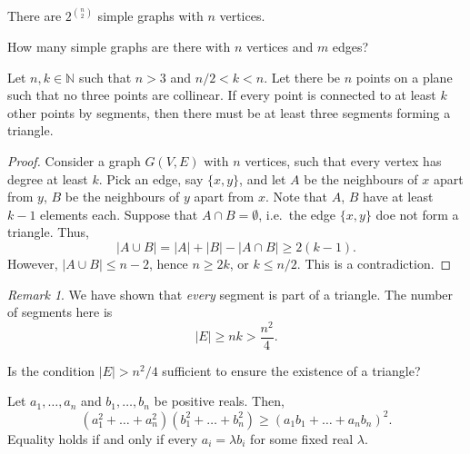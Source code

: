 \documentclass[11pt]{article}
\newcommand{\N}{\mathbb{N}}
\theoremstyle{definition}
\theoremstyle{remark}
\newtheorem*{remark}{Remark}
\numberwithin{equation}{section}
\begin{document}
    \begin{theorem}
        There are $2^{\binom{n}{2}}$ simple graphs with $n$ vertices.
    \end{theorem}
    \begin{exercise}
        How many simple graphs are there with $n$ vertices and $m$ edges?
    \end{exercise}
    \begin{theorem}
        Let $n, k \in \N$ such that $n > 3$ and $n / 2 < k < n$. Let there be $n$
        points on a plane such that no three points are collinear. If every point is
        connected to at least $k$ other points by segments, then there must be at
        least three segments forming a triangle.
    \end{theorem}
    \begin{proof}
        Consider a graph $G(V, E)$ with $n$ vertices, such that every vertex has
        degree at least $k$. Pick an edge, say $\{x, y\}$, and let $A$ be the
        neighbours of $x$ apart from $y$, $B$ be the neighbours of $y$ apart from
        $x$. Note that $A$, $B$ have at least $k - 1$ elements each. Suppose that $A
        \cap B = \emptyset$, i.e.\ the edge $\{x, y\}$ doe not form a triangle. Thus,
        \[
            |A\cup B| = |A| + |B| - |A \cap B| \geq 2(k - 1).
        \] However, $|A\cup B| \leq n - 2$, hence $n \geq 2k$, or $k \leq n / 2$.
        This is a contradiction.
    \end{proof}
    \begin{remark}
        We have shown that \emph{every} segment is part of a triangle. The number of
        segments here is \[
            |E| \geq n k > \frac{n^2}{4}.
        \] 
    \end{remark}
    \begin{exercise}
        Is the condition $|E| > n^2 / 4$ sufficient to ensure the existence of a triangle?
    \end{exercise}

    \begin{lemma}
        Let $a_1, \dots, a_n$ and $b_1, \dots, b_n$ be positive reals. Then, \[
            (a_1^2 + \dots + a_n^2) (b_1^2 + \dots + b_n^2) \geq (a_1b_1 + \dots +
            a_nb_n)^2.
        \] Equality holds if and only if every $a_i = \lambda b_i$ for some fixed
        real $\lambda$.
    \end{lemma}
\end{document}
